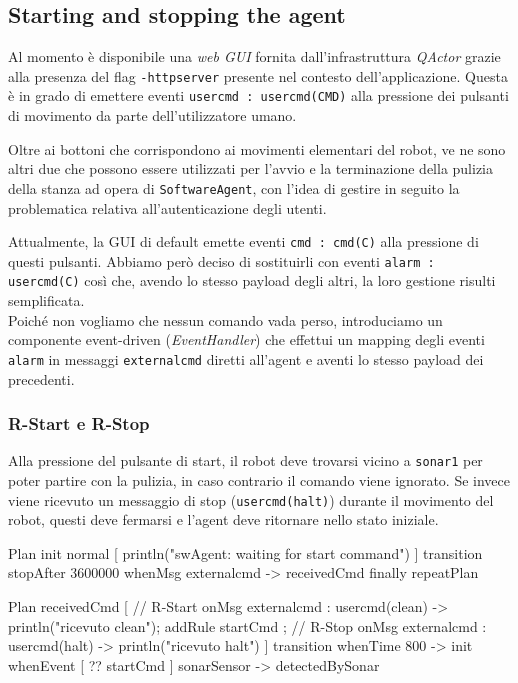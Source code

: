\documentclass{../llncs}
\newcommand{\codescript}[1]{{\mbox{\small{\texttt{#1}}}}\xspace}
\newcommand{\code}[1]{{\color{blue}\small{\texttt{#1}}}}
\newcommand{\qa}{\textsf{\textit{QActor}}\xspace}
\begin{document}
\subsection{Starting and stopping the agent}
Al momento è disponibile una \emph{web GUI} fornita dall'infrastruttura \qa grazie alla presenza del flag \codescript{-httpserver} presente nel contesto dell'applicazione. Questa è in grado di emettere eventi \codescript{usercmd : usercmd(CMD)} alla pressione dei pulsanti di movimento da parte dell'utilizzatore umano.

Oltre ai bottoni che corrispondono ai movimenti elementari del robot, ve ne sono altri due che possono essere utilizzati per l'avvio e la terminazione della pulizia della stanza ad opera di \texttt{SoftwareAgent}, con l'idea di gestire in seguito la problematica relativa all'autenticazione degli utenti.

Attualmente, la GUI di default emette eventi \codescript{cmd : cmd(C)} alla pressione di questi pulsanti. Abbiamo però deciso di sostituirli con eventi \codescript{alarm : usercmd(C)} così che, avendo lo stesso payload degli altri, la loro gestione risulti semplificata.\\

Poiché non vogliamo che nessun comando vada perso, introduciamo un componente event-driven (\emph{EventHandler}) che effettui un mapping degli eventi \codescript{alarm} in messaggi \codescript{externalcmd} diretti all'agent e aventi lo stesso payload dei precedenti.

\subsubsection{R-Start e R-Stop}
Alla pressione del pulsante di start, il robot deve trovarsi vicino a \code{sonar1} per poter partire con la pulizia, in caso contrario il comando viene ignorato. Se invece viene ricevuto un messaggio di stop (\codescript{usercmd(halt)}) durante il movimento del robot, questi deve fermarsi e l'agent deve ritornare nello stato iniziale.\\

\begin{qacode}[caption={SoftwareAgent, pt1}]
Plan init normal [
   	println("swAgent: waiting for start command")
]
transition stopAfter 3600000
	whenMsg externalcmd -> receivedCmd
finally repeatPlan

Plan receivedCmd [
	// R-Start
	onMsg externalcmd : usercmd(clean) -> {
   		println("ricevuto clean");
   		addRule startCmd
	};
	// R-Stop
   	onMsg externalcmd : usercmd(halt) -> println("ricevuto halt")
]
transition
	whenTime 800 -> init
	whenEvent [ ?? startCmd ] sonarSensor -> detectedBySonar
\end{qacode}
\end{document}
